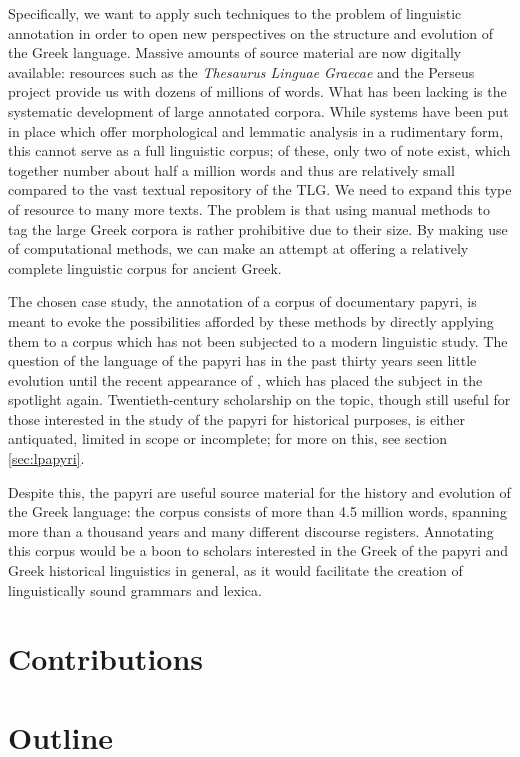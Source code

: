 Specifically, we want to apply such techniques to the problem of
linguistic annotation in order to open new perspectives on the
structure and evolution of the Greek language. Massive amounts of
source material are now digitally available: resources such as the
\textit{Thesaurus Linguae Graecae} and the Perseus project provide us
with dozens of millions of words. What has been lacking is the
systematic development of large annotated corpora. While systems have
been put in place which offer morphological and lemmatic analysis in a
rudimentary form, this cannot serve as a full linguistic corpus; of
these, only two of note exist, which together number about half a
million words and thus are relatively small compared to the vast
textual repository of the TLG. We need to expand this type of resource
to many more texts. The problem is that using manual methods to tag
the large Greek corpora is rather prohibitive due to their size. By
making use of computational methods, we can make an attempt at
offering a relatively complete linguistic corpus for ancient Greek.

The chosen case study, the annotation of a corpus of documentary
papyri, is meant to evoke the possibilities afforded by these methods
by directly applying them to a corpus which has not been subjected to
a modern linguistic study. The question of the language of the papyri
has in the past thirty years seen little evolution until the recent
appearance of \cite{lpapyri}, which has placed the subject in the
spotlight again. Twentieth-century scholarship on the topic, though
still useful for those interested in the study of the papyri for
historical purposes, is either antiquated, limited in scope or
incomplete; for more on this, see section \vref{sec:lpapyri}. 

Despite this, the papyri are useful source material for the history
and evolution of the Greek language: the corpus consists of more than
4.5 million words, spanning more than a thousand years and many
different discourse registers. Annotating this corpus would be a boon
to scholars interested in the Greek of the papyri and Greek historical
linguistics in general, as it would facilitate the creation of
linguistically sound grammars and lexica.

\section{Contributions}

\section{Outline}

